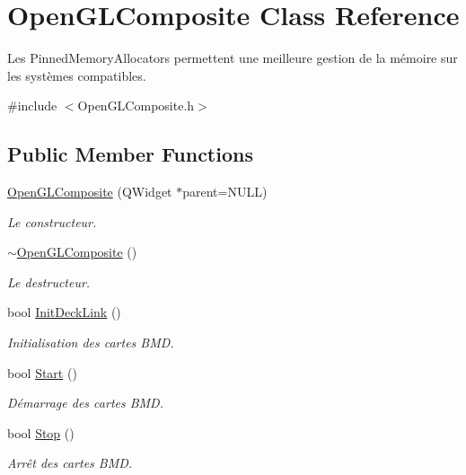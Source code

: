 \hypertarget{classOpenGLComposite}{
\section{OpenGLComposite Class Reference}
\label{classOpenGLComposite}
}


Les PinnedMemoryAllocators permettent une meilleure gestion de la mémoire sur les systèmes compatibles.  




{\ttfamily \#include $<$OpenGLComposite.h$>$}

\subsection*{Public Member Functions}
\begin{DoxyCompactItemize}
\item 
\hyperlink{classOpenGLComposite_a6bb5579d673170405b5ea131c454ba5c}{OpenGLComposite} (QWidget $\ast$parent=NULL)
\begin{DoxyCompactList}\small\item\em Le constructeur. \item\end{DoxyCompactList}\item 
\hyperlink{classOpenGLComposite_abe7ea6a3fbdb61a79ebde5e22929ef1a}{$\sim$OpenGLComposite} ()
\begin{DoxyCompactList}\small\item\em Le destructeur. \item\end{DoxyCompactList}\item 
bool \hyperlink{classOpenGLComposite_ab6a36e1b442176b85c26f3bab5c495a2}{InitDeckLink} ()
\begin{DoxyCompactList}\small\item\em Initialisation des cartes BMD. \item\end{DoxyCompactList}\item 
\hypertarget{classOpenGLComposite_a8d9c364bd561d2d8121d3951655dd58d}{
bool \hyperlink{classOpenGLComposite_a8d9c364bd561d2d8121d3951655dd58d}{Start} ()}
\label{classOpenGLComposite_a8d9c364bd561d2d8121d3951655dd58d}

\begin{DoxyCompactList}\small\item\em Démarrage des cartes BMD. \item\end{DoxyCompactList}\item 
\hypertarget{classOpenGLComposite_a087592bf53ea8bfe6f763bcd58da3652}{
bool \hyperlink{classOpenGLComposite_a087592bf53ea8bfe6f763bcd58da3652}{Stop} ()}
\label{classOpenGLComposite_a087592bf53ea8bfe6f763bcd58da3652}

\begin{DoxyCompactList}\small\item\em Arrêt des cartes BMD. \item\end{DoxyCompactList}\end{DoxyCompactItemize}


